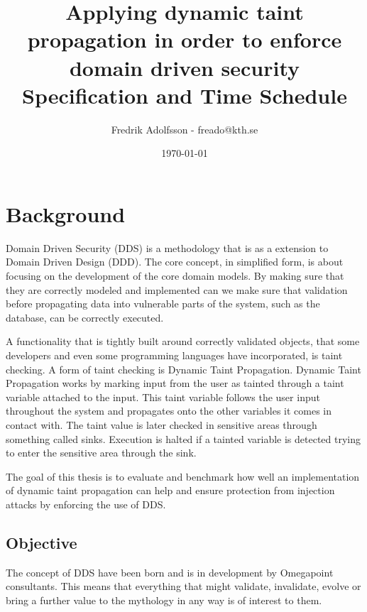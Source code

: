 \documentclass{../kththesis}
\title{Applying dynamic taint propagation in order to enforce domain driven security \\
        \large Specification and Time Schedule}
\author{Fredrik Adolfsson - freado@kth.se}
\date{\today}
\begin{document}
\frontmatter


\titlepage


\tableofcontents


\mainmatter



\chapter{Background}
Domain Driven Security (DDS) is a methodology that is as a extension to Domain Driven Design (DDD). The core concept, in simplified form, is about focusing on the development of the core domain models. By making sure that they are correctly modeled and implemented can we make sure that validation before propagating data into vulnerable parts of the system, such as the database, can be correctly executed. \parencite{evans_2015, EvansEric2004Dd:t, Wilander2009, Johnsson2009}

A functionality that is tightly built around correctly validated objects, that some developers and even some programming languages have incorporated, is taint checking. \parencite{perl, ruby, Clause2007} A form of taint checking is Dynamic Taint Propagation. Dynamic Taint Propagation works by marking input from the user as tainted through a taint variable attached to the input. This taint variable follows the user input throughout the system and propagates onto the other variables it comes in contact with. The taint value is later checked in sensitive areas through something called sinks. Execution is halted if a tainted variable is detected trying to enter the sensitive area through the sink. \parencite{Pan2015, Venkataramani2008}

The goal of this thesis is to evaluate and benchmark how well an implementation of dynamic taint propagation can help and ensure protection from injection attacks by enforcing the use of DDS. 


\section{Objective}
The concept of DDS have been born and is in development by Omegapoint consultants. This means that everything that might validate, invalidate, evolve or bring a further value to the mythology in any way is of interest to them. 
\end{document}
